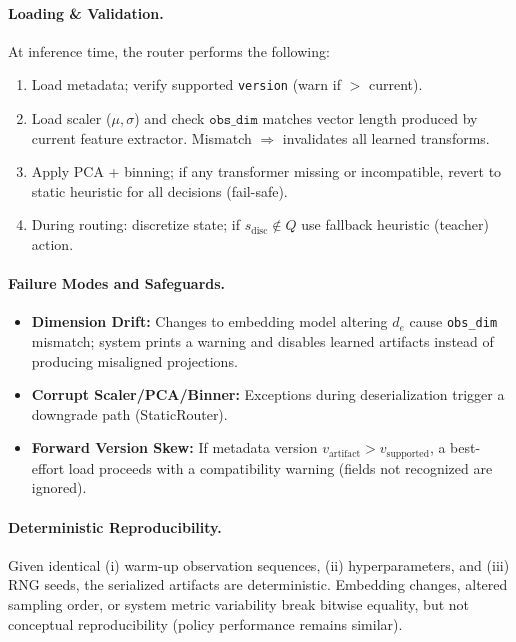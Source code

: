 \paragraph{Loading \& Validation.}
At inference time, the router performs the following:
\begin{enumerate}
  \item Load metadata; verify supported \texttt{version} (warn if $>$ current).
  \item Load scaler ($\mu,\sigma$) and check $\texttt{obs\_dim}$ matches vector length produced by current feature extractor. Mismatch $\Rightarrow$ invalidates all learned transforms.
  \item Apply PCA + binning; if any transformer missing or incompatible, revert to static heuristic for all decisions (fail-safe).
  \item During routing: discretize state; if $s_{\text{disc}} \notin Q$ use fallback heuristic (teacher) action.
\end{enumerate}

\paragraph{Failure Modes and Safeguards.}
\begin{itemize}
  \item \textbf{Dimension Drift:} Changes to embedding model altering $d_e$ cause \texttt{obs\_dim} mismatch; system prints a warning and disables learned artifacts instead of producing misaligned projections.
  \item \textbf{Corrupt Scaler/PCA/Binner:} Exceptions during deserialization trigger a downgrade path (StaticRouter).
  \item \textbf{Forward Version Skew:} If metadata version $v_{\text{artifact}} > v_{\text{supported}}$, a best-effort load proceeds with a compatibility warning (fields not recognized are ignored).
\end{itemize}

\paragraph{Deterministic Reproducibility.}
Given identical (i) warm-up observation sequences, (ii) hyperparameters, and (iii) RNG seeds, the serialized artifacts are deterministic. Embedding changes, altered sampling order, or system metric variability break bitwise equality, but not conceptual reproducibility (policy performance remains similar).


